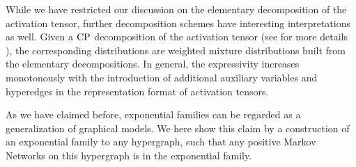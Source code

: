 While we have restricted our discussion on the elementary decomposition of the activation tensor, further decomposition schemes have interesting interpretations as well.
Given a $\mathrm{CP}$ decomposition of the activation tensor (see for more details ), the corresponding distributions are weighted mixture distributions built from the elementary decompositions.
In general, the expressivity increases monotonously with the introduction of additional auxiliary variables and hyperedges in the representation format of activation tensors.



As we have claimed before, exponential families can be regarded as a generalization of graphical models.
We here show this claim by a construction of an exponential family to any hypergraph, such that any positive Markov Networks on this hypergraph is in the exponential family.

